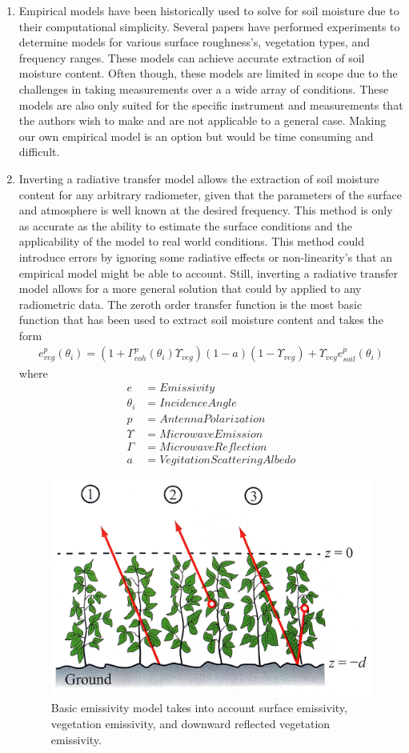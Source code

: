\documentclass[12pt]{article}
\begin{document}
\begin{enumerate}
\item Empirical models have been historically used to solve for soil moisture due to their computational simplicity. Several papers have performed experiments to determine models for various surface roughness's, vegetation types, and frequency ranges. These models can achieve accurate extraction of soil moisture content. Often though, these models are limited in scope due to the challenges in taking measurements over a a wide array of conditions. These models are also only suited for the specific instrument and measurements that the authors wish to make and are not applicable to a general case. Making our own empirical model is an option but would be time consuming and difficult.


\item Inverting a radiative transfer model allows the extraction of soil moisture content for any arbitrary radiometer, given that the parameters of the surface and atmosphere is well known at the desired frequency. This method is only as accurate as the ability to estimate the surface conditions and the applicability of the model to real world conditions. This method could introduce errors by ignoring some radiative effects or non-linearity's that an empirical model might be able to account. Still, inverting a radiative transfer model allows for a more general solution that could by applied to any radiometric data. The zeroth order transfer function is the most basic function that has been used to extract soil moisture content and takes the form
\begin{align}
e_{veg}^p(\theta_i) = (1+\Gamma_{coh}^p(\theta_i)\Upsilon_{veg})(1-a)(1-\Upsilon_{veg})+\Upsilon_{veg}e_{soil}^p(\theta_i)
\end{align}
where
\begin{align}
e &= Emissivity\\
\theta_i &= Incidence Angle\\
p &= Antenna Polarization\\
\Upsilon &= Microwave Emission\\
\Gamma &= Microwave Reflection\\
a &= Vegitation Scattering Albedo
\end{align}

\begin{figure}[htbp!]
	\centering
	\includegraphics[width=.4\linewidth]{Figures/ZRT.jpg}
	\caption{Basic emissivity model takes into account surface emissivity, vegetation emissivity, and downward reflected vegetation emissivity. \cite{ulaby_fung_moore_1986}}
	\label{fig:zrt}
\end{figure}


\end{enumerate}
\end{document}
